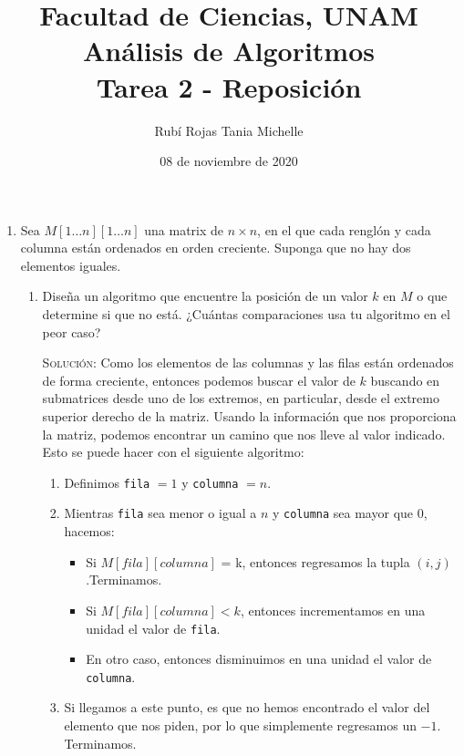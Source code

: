 \documentclass[letterpaper,11pt]{article}
\title{Facultad de Ciencias, UNAM \\ 
       Análisis de Algoritmos \\ 
       Tarea 2 - Reposición}
\author{Rubí Rojas Tania Michelle}
\date{08 de noviembre de 2020}
\begin{document}
\maketitle

\begin{enumerate}
    \item Sea $M [1 \dots n][1 \dots n]$ una matrix de $n \times n$, en el que 
    cada renglón y cada columna están ordenados en orden creciente. Suponga que 
    no hay dos elementos iguales.
    
    \begin{enumerate}
        \item Diseña un algoritmo que encuentre la posición de un valor $k$ en 
        $M$ o que determine si que no está. ¿Cuántas comparaciones usa tu 
        algoritmo en el peor caso?

        \textsc{Solución:} Como los elementos de las columnas y las filas 
        están ordenados de forma creciente, entonces podemos buscar el valor 
        de $k$ buscando en submatrices desde uno de los extremos, en 
        particular, desde el extremo superior derecho de la matriz. Usando la 
        información que nos proporciona la matriz, podemos encontrar un 
        camino que nos lleve al valor indicado. Esto se puede hacer con el 
        siguiente algoritmo:
        \begin{enumerate}
            \item Definimos \texttt{fila} $= 1$ y  \texttt{columna} $= n$.

            \item Mientras \texttt{fila} sea menor o igual a $n$ y 
            \texttt{columna} sea mayor que $0$, 
            hacemos:
            \begin{itemize}
                \item Si $M[fila][columna]$ = k, entonces regresamos la tupla 
                $(i,j)$.Terminamos.

                \item Si $M[fila][columna] < k$, entonces incrementamos en 
                una unidad el valor de \texttt{fila}.

                \item En otro caso, entonces disminuimos en una unidad el 
                valor de \texttt{columna}.
            \end{itemize}

            \item Si llegamos a este punto, es que no hemos encontrado el 
            valor del elemento que nos piden, por lo que simplemente regresamos 
            un $-1$. Terminamos. 
        \end{enumerate}


\end{enumerate}
\end{enumerate}
\end{document}

